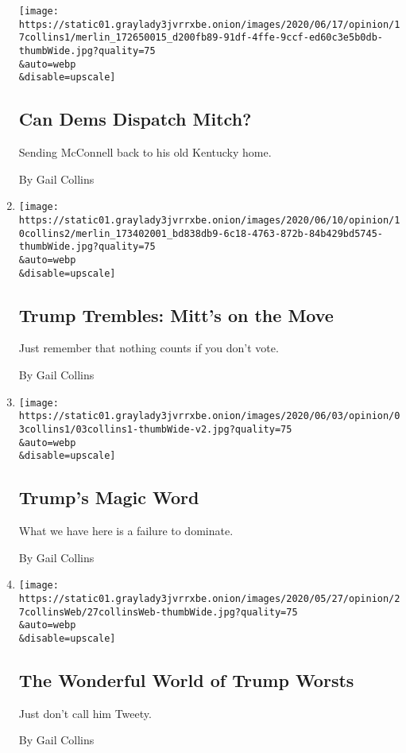 \begin{enumerate}
  \texttt{[image: https://static01.graylady3jvrrxbe.onion/images/2020/06/17/opinion/17collins1/merlin\_172650015\_d200fb89-91df-4ffe-9ccf-ed60c3e5b0db-thumbWide.jpg?quality=75\\\&auto=webp\\\&disable=upscale]}

  \hypertarget{can-dems-dispatch-mitch}{%
  \subsection{Can Dems Dispatch Mitch?}\label{can-dems-dispatch-mitch}}

  Sending McConnell back to his old Kentucky home.

  By Gail Collins
\item
  \href{/2020/06/10/opinion/trump-romney-murkowski.html}{}

  \texttt{[image: https://static01.graylady3jvrrxbe.onion/images/2020/06/10/opinion/10collins2/merlin\_173402001\_bd838db9-6c18-4763-872b-84b429bd5745-thumbWide.jpg?quality=75\\\&auto=webp\\\&disable=upscale]}

  \hypertarget{trump-trembles-mitts-on-the-move}{%
  \subsection{Trump Trembles: Mitt's on the
  Move}\label{trump-trembles-mitts-on-the-move}}

  Just remember that nothing counts if you don't vote.

  By Gail Collins
\item
  \href{/2020/06/03/opinion/trump-dominate.html}{}

  \texttt{[image: https://static01.graylady3jvrrxbe.onion/images/2020/06/03/opinion/03collins1/03collins1-thumbWide-v2.jpg?quality=75\\\&auto=webp\\\&disable=upscale]}

  \hypertarget{trumps-magic-word}{%
  \subsection{Trump's Magic Word}\label{trumps-magic-word}}

  What we have here is a failure to dominate.

  By Gail Collins
\item
  \href{/2020/05/27/opinion/donald-trump.html}{}

  \texttt{[image: https://static01.graylady3jvrrxbe.onion/images/2020/05/27/opinion/27collinsWeb/27collinsWeb-thumbWide.jpg?quality=75\\\&auto=webp\\\&disable=upscale]}

  \hypertarget{the-wonderful-world-of-trump-worsts}{%
  \subsection{The Wonderful World of Trump
  Worsts}\label{the-wonderful-world-of-trump-worsts}}

  Just don't call him Tweety.

  By Gail Collins
\end{enumerate}

